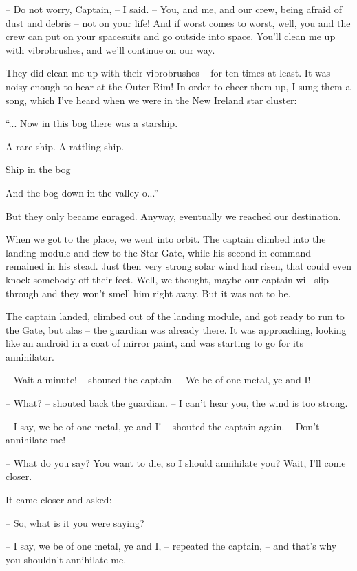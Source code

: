\documentclass[ebook,oneside,final,openright]{memoir}
\begin{document}
– Do not worry, Captain, – I said. – You, and me, and our crew, being afraid of dust and debris – not on your life! And if worst comes to worst, well, you and the crew can put on your spacesuits and go outside into space. You’ll clean me up with vibrobrushes, and we’ll continue on our way.\par
\par
They did clean me up with their vibrobrushes – for ten times at least. It was noisy enough to hear at the Outer Rim! In order to cheer them up, I sung them a song, which I’ve heard when we were in the New Ireland star cluster: \par
“... Now in this bog there was a starship.\par
A rare ship. A rattling ship.\par
Ship in the bog\par
And the bog down in the valley-o...”\par
 But they only became enraged. Anyway, eventually we reached our destination.\par
\par
When we got to the place, we went into orbit. The captain climbed into the landing module and flew to the Star Gate, while his second-in-command remained in his stead. Just then very strong solar wind had risen, that could even knock somebody off their feet. Well, we thought, maybe our captain will slip through and they won’t smell him right away. But it was not to be.\par
\par
The captain landed, climbed out of the landing module, and got ready to run to the Gate, but alas – the guardian was already there. It was approaching, looking like an android in a coat of mirror paint, and was starting to go for its annihilator.\par
– Wait a minute! – shouted the captain. – We be of one metal, ye and I!\par
– What? – shouted back the guardian. – I can’t hear you, the wind is too strong.\par
– I say, we be of one metal, ye and I! – shouted the captain again. – Don’t annihilate me!\par
– What do you say? You want to die, so I should annihilate you? Wait, I’ll come closer.\par
\par
It came closer and asked:\par
– So, what is it you were saying?\par
– I say, we be of one metal, ye and I, – repeated the captain, – and that’s why you shouldn’t annihilate me.\par
\end{document}
